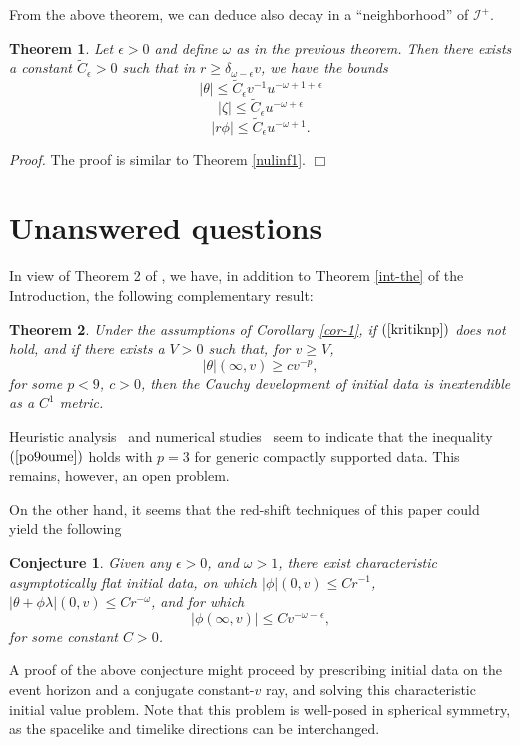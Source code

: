 \documentclass{article}
\newtheorem{theorem}{Theorem}[section]
\newtheorem{conjecture}{Conjecture}[section]
\begin{document}
From the above theorem, we can deduce also decay in a ``neighborhood'' of
$\mathcal{I}^+$.
\begin{theorem}
\label{final2}
Let $\epsilon>0$ and define $\omega$ as in the previous theorem. Then
there exists a constant $\tilde{C}_\epsilon>0$ such that
in $r\ge \delta_{\omega-\epsilon}v$, we have the bounds
\[
|\theta|\le \tilde{C}_\epsilon v^{-1}u^{-\omega+1+\epsilon}
\]
\[
|\zeta|\le \tilde{C}_\epsilon u^{-\omega+\epsilon}
\]
\[
|r\phi|\le \tilde{C}_\epsilon u^{-\omega+1}.
\]
\end{theorem}

\noindent\emph{Proof.} The proof is similar to Theorem \ref{nulinf1}. $\Box$

\section{Unanswered questions}
\label{sharpsec}
In view of Theorem 2 of \cite{md:cbh}, we have, in addition to
Theorem \ref{int-the} of the Introduction, the following complementary  
result:
\begin{theorem} Under the assumptions of Corollary \ref{cor-1}, if $(\ref{kritiknp})$ does
not hold, and if there exists a $V>0$ such that, for $v\ge V$, 
\begin{equation}
\label{po9oume}
|\theta|(\infty,v)\ge cv^{-p}, 
\end{equation}
for some $p<9$, $c>0$,
then the Cauchy development of initial data is \emph{inextendible}
as a $C^1$ metric. 
\end{theorem}

Heuristic analysis~\cite{gpp:de1, rpr:ns, lb:sbh, bo:lt} and 
numerical studies~\cite{gpp:de, bo:lte, mc:bhsf}
seem to indicate that the inequality $(\ref{po9oume})$ holds
with $p=3$ for generic compactly supported data. This remains, however,
an open problem.

On the other hand, it seems that the red-shift techniques of this paper 
could
yield the following
\begin{conjecture}
\label{conj2} 
Given any $\epsilon>0$, and $\omega>1$, there exist characteristic asymptotically
flat initial data, on
which $|\phi|(0,v)\le Cr^{-1}$, $|\theta+\phi\lambda|(0,v)\le Cr^{-\omega}$, and for 
which 
\[
|\phi(\infty,v)|\le Cv^{-\omega-\epsilon},
\]
for some constant $C>0$.
\end{conjecture}

A proof of the above conjecture might proceed by prescribing initial data
on the event horizon and a conjugate constant-$v$ ray, and solving this
characteristic initial value problem. Note that this problem is well-posed
in spherical symmetry, as the spacelike and timelike directions can be
interchanged.
\end{document}
